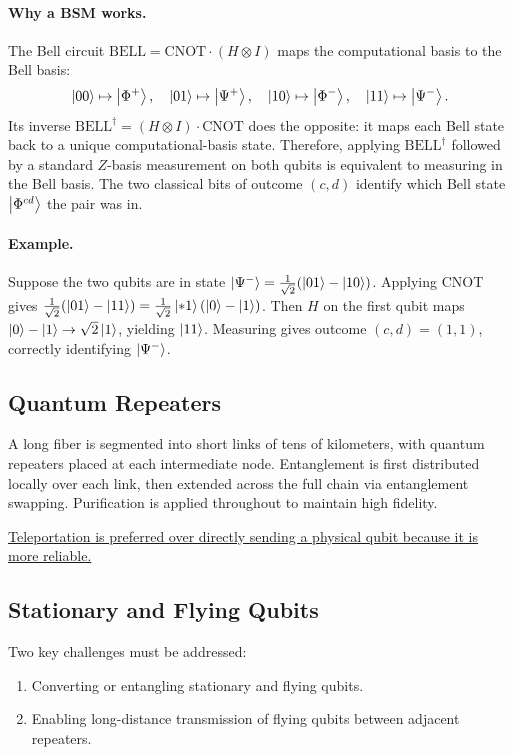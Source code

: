 \documentclass[10pt,a4paper]{article}
\begin{document}
\paragraph{Why a BSM works.}
The Bell circuit $\mathrm{BELL}=\mathrm{CNOT}\cdot(H\otimes I)$ maps the computational basis to the Bell basis:
\[
\ket{00}\mapsto\ket{\Phi^+},\quad \ket{01}\mapsto\ket{\Psi^+},\quad \ket{10}\mapsto\ket{\Phi^-},\quad \ket{11}\mapsto\ket{\Psi^-}.
\]
Its inverse $\mathrm{BELL}^\dagger=(H\otimes I)\cdot\mathrm{CNOT}$ does the opposite: it maps each Bell state back to a unique computational-basis state. Therefore, applying $\mathrm{BELL}^\dagger$ followed by a standard $Z$-basis measurement on both qubits is equivalent to measuring in the Bell basis. The two classical bits of outcome $(c,d)$ identify which Bell state $\ket{\Phi^{cd}}$ the pair was in.

\paragraph{Example.} Suppose the two qubits are in state $\ket{\Psi^-}=\tfrac{1}{\sqrt{2}}(\ket{01}-\ket{10})$. Applying CNOT gives $\tfrac{1}{\sqrt{2}}(\ket{01}-\ket{11})=\tfrac{1}{\sqrt{2}}\ket{*1}(\ket{0}-\ket{1})$. Then $H$ on the first qubit maps $\ket{0}-\ket{1}\to\sqrt{2}\ket{1}$, yielding $\ket{11}$. Measuring gives outcome $(c,d)=(1,1)$, correctly identifying $\ket{\Psi^-}$.

\subsection{Quantum Repeaters}

A long fiber is segmented into short links of tens of kilometers, with quantum repeaters placed at each intermediate node. Entanglement is first distributed locally over each link, then extended across the full chain via entanglement swapping. Purification is applied throughout to maintain high fidelity.

\uline{Teleportation is preferred over directly sending a physical qubit because it is more reliable.}

\subsection{Stationary and Flying Qubits}

Two key challenges must be addressed:
\begin{enumerate}[leftmargin=*, nosep]
  \item Converting or entangling stationary and flying qubits.
  \item Enabling long-distance transmission of flying qubits between adjacent repeaters.
\end{enumerate}
\end{document}
